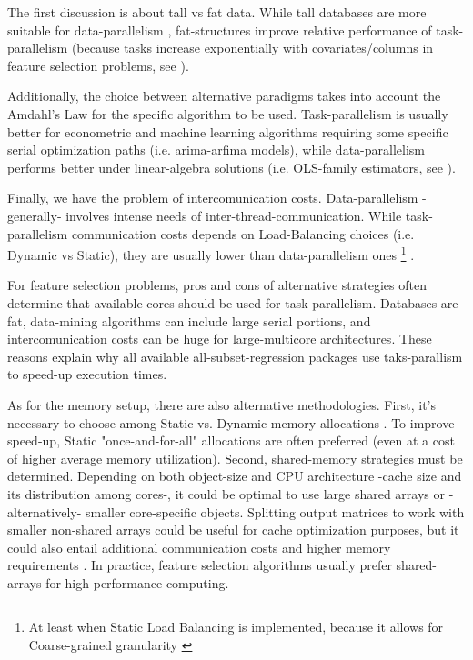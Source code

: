\documentclass{juliacon}
\begin{document}
The first discussion is about tall vs fat data. While tall databases are more suitable for data-parallelism \cite{babu2013}, fat-structures improve relative performance of task-parallelism (because tasks increase exponentially with covariates/columns in feature selection problems, see \cite{foster1994}). \vskip 6pt

Additionally, the choice between alternative paradigms takes into account the Amdahl's Law for the specific algorithm to be used. Task-parallelism is usually better for econometric and machine learning algorithms requiring some specific serial optimization paths (i.e. arima-arfima models), while data-parallelism performs better under linear-algebra solutions (i.e. OLS-family estimators, see \cite{guo2012}). \vskip 6pt

Finally, we have the problem of intercomunication costs. Data-parallelism -generally- involves intense needs of inter-thread-communication. While task-parallelism communication costs depends on Load-Balancing choices (i.e. Dynamic vs Static), they are usually lower than data-parallelism ones \footnote{At least when Static Load Balancing is implemented, because it allows for Coarse-grained granularity \cite{gordon2006}} \cite{MOREANO2017}. \vskip 6pt

For feature selection problems, pros and cons of alternative strategies often determine that available cores should be used for task parallelism. Databases are fat, data-mining algorithms can include large serial portions, and intercomunication costs can be huge for large-multicore architectures. These reasons explain why all available all-subset-regression packages use taks-parallism to speed-up execution times. \vskip 6pt

As for the memory setup, there are also alternative methodologies. First, it's necessary to choose among Static vs. Dynamic memory allocations \cite{prajapati2015}. To improve speed-up, Static "once-and-for-all" allocations are often preferred (even at a cost of higher average memory utilization). Second, shared-memory strategies must be determined. Depending on both object-size and CPU architecture -cache size and its distribution among cores-, it could be optimal to use large shared arrays or -alternatively- smaller core-specific objects. Splitting output matrices to work with smaller non-shared arrays could be useful for cache optimization purposes, but it could also entail additional communication costs and higher memory requirements \cite{ahmed2015}. In practice, feature selection algorithms usually prefer shared-arrays for high performance computing. \vskip 6pt
\end{document}
